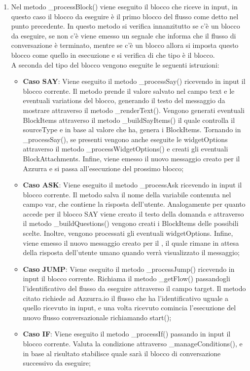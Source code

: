 \begin{enumerate}
	\item Nel metodo \_processBlock() viene eseguito il blocco che riceve in input, in questo caso il blocco da eseguire è il primo blocco del flusso come detto nel punto precedente. In questo metodo si verifica innanzitutto se c'è un blocco da eseguire, se non c'è viene emesso un segnale che informa che il flusso di conversazione è terminato, mentre se c'è un blocco allora si imposta questo blocco come quello in esecuzione e si verifica di che tipo è il blocco.\\
	A seconda del tipo del blocco vengono eseguite le seguenti istruzioni:
	\begin{itemize}
		\item \textbf{Caso SAY}: Viene eseguito il metodo \_processSay() ricevendo in input il blocco corrente. Il metodo prende il valore salvato nel campo text e le eventuali variations del blocco, generando il testo del messaggio da mostrare attraverso il metodo \_renderText(). Vengono generati eventuali BlockItems attraverso il metodo \_buildSayItems() il quale controlla il sourceType e in base al valore che ha, genera i BlockItems. Tornando in \_processSay(), se presenti vengono anche eseguite le widgetOptions attraverso il metodo \_processWidgetOptions() e creati gli eventuali BlockAttachments. Infine, viene emesso il nuovo messaggio creato per il  Azzurra e si passa all'esecuzione del prossimo blocco;
		\item \textbf{Caso ASK}: Viene eseguito il metodo \_processAsk ricevendo in input il blocco corrente. Il metodo salva il nome della variabile contenuta nel campo var, che contiene la risposta dell'utente. Analogamente per quanto accede per il blocco SAY viene creato il testo della domanda e attraverso il metodo \_buildQuestions() vengono creati i BlockItems delle possibili scelte. Inoltre, vengono processati gli eventuali widgetOptions. Infine, viene emesso il nuovo messaggio creato per il , il quale rimane in attesa della risposta dell'utente umano quando verrà visualizzato il messaggio;
		\item \textbf{Caso JUMP}: Viene eseguito il metodo \_processJump() ricevendo in input il blocco corrente. Richiama il metodo \_getFlow() passandogli l'identificativo del flusso da eseguire attraverso il campo target. Il metodo citato richiede ad Azzurra.io il flusso che ha l'identificativo uguale a quello ricevuto in input, e una volta ricevuto comincia l'esecuzione del nuovo flusso conversazionale richiamando start();
		\item \textbf{Caso IF}: Viene eseguito il metodo \_processIf() passando in input il blocco corrente. Valuta la condizione attraverso \_manageConditions(), e in base al risultato stabilisce quale sarà il blocco di conversazione successivo da eseguire;

\end{itemize}
\end{enumerate}
